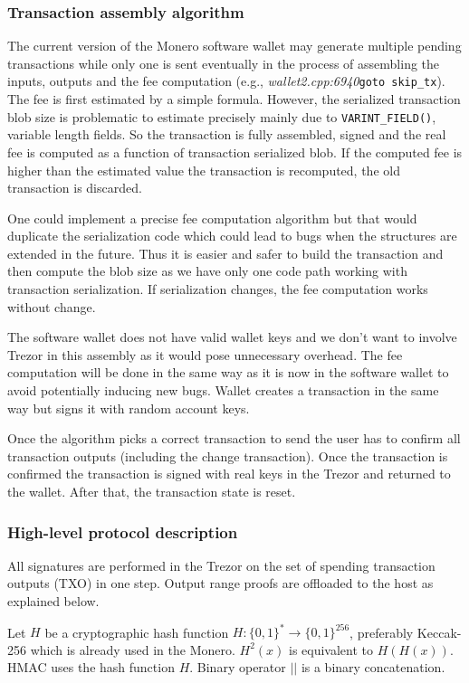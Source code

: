 \documentclass[]{article}
\begin{document}
\subsubsection{Transaction assembly algorithm}

The current version of the Monero software wallet may generate multiple pending transactions while only one is sent eventually in the process of assembling the inputs, outputs and the fee computation (e.g., \emph{wallet2.cpp:6940}\;\verb|goto skip_tx|). The fee is first estimated by a simple formula. However, the serialized transaction blob size is problematic to estimate precisely mainly due to \verb|VARINT_FIELD()|, variable length fields. So the transaction is fully assembled, signed and the real fee is computed as a function of transaction serialized blob. If the computed fee is higher than the  estimated value the transaction is recomputed, the old transaction is discarded. 

One could implement a precise fee computation algorithm but that would duplicate the serialization code which could lead to bugs when the structures are extended in the future. Thus it is easier and safer to build the transaction and then compute the blob size as we have only one code path working with transaction serialization. If serialization changes, the fee computation works without change. 

The software wallet does not have valid wallet keys and we don't want to involve Trezor in this assembly as it would pose unnecessary overhead. The fee computation will be done in the same way as it is now in the software wallet to avoid potentially inducing new bugs. Wallet creates a transaction in the same way but signs it with random account keys. 

Once the algorithm picks a correct transaction to send the user has to confirm all transaction outputs (including the change transaction). Once the transaction is confirmed the transaction is signed with real keys in the Trezor and returned to the wallet. After that, the transaction state is reset.


\subsubsection{High-level protocol description} 
All signatures are performed in the Trezor on the set of spending transaction outputs (TXO) in one step. Output range proofs are offloaded to the host as explained below.

Let $H$ be a cryptographic hash function $H : \{0,1\}^* \rightarrow \{0,1\}^{256}$, preferably Keccak-256 which is already used in the Monero. $H^2(x)$ is equivalent to $H(H(x))$.  HMAC uses the hash function $H$. Binary operator $||$ is a binary concatenation.
\end{document}
